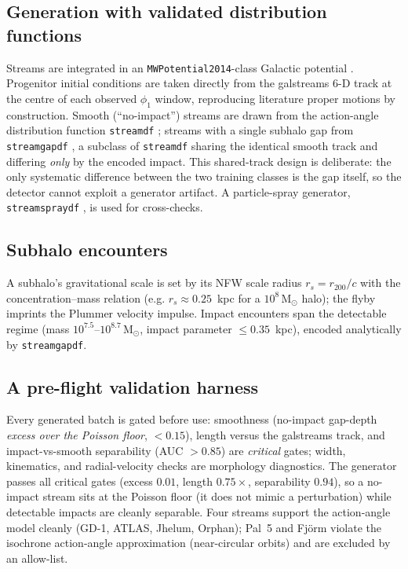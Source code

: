 \documentclass[fleqn,usenatbib]{mnras}
\newcommand{\msun}{\ensuremath{\mathrm{M}_\odot}}
\newcommand{\code}[1]{\texttt{#1}}
\begin{document}
\subsection{Generation with validated distribution functions}
Streams are integrated in an \code{MWPotential2014}-class Galactic potential
\citep[galpy, C \code{dop853} integrator;][]{Bovy2015galpy}. Progenitor initial
conditions are taken directly from the galstreams \citep{Mateu2023galstreams} 6-D
track at the centre of each observed $\phi_1$ window, reproducing literature proper
motions by construction. Smooth (``no-impact'') streams are drawn from the
action-angle distribution function \code{streamdf} \citep{Bovy2014streamdf}; streams
with a single subhalo gap from \code{streamgapdf} \citep{SandersBovyErkal2016}, a
subclass of \code{streamdf} sharing the identical smooth track and differing
\emph{only} by the encoded impact. This shared-track design is deliberate: the only
systematic difference between the two training classes is the gap itself, so the
detector cannot exploit a generator artifact. A particle-spray generator,
\code{streamspraydf} \citep{Fardal2015}, is used for cross-checks.

\subsection{Subhalo encounters}
A subhalo's gravitational scale is set by its NFW scale radius $r_s=r_{200}/c$ with the
\citet{Ludlow2016} concentration--mass relation (e.g. $r_s\approx0.25$~kpc for a
$10^8\,\msun$ halo); the flyby imprints the \citet{ErkalBelokurov2015} Plummer
velocity impulse. Impact encounters span the detectable regime (mass
$10^{7.5}$--$10^{8.7}\,\msun$, impact parameter $\le0.35$~kpc), encoded analytically by
\code{streamgapdf}.

\subsection{A pre-flight validation harness}
Every generated batch is gated before use: smoothness (no-impact gap-depth
\emph{excess over the Poisson floor}, $<0.15$), length versus the galstreams track,
and impact-vs-smooth separability (AUC $>0.85$) are \emph{critical} gates; width,
kinematics, and radial-velocity checks are morphology diagnostics. The generator
passes all critical gates (excess $0.01$, length $0.75\times$, separability $0.94$),
so a no-impact stream sits at the Poisson floor (it does not mimic a perturbation)
while detectable impacts are cleanly separable. Four streams support the action-angle
model cleanly (GD-1, ATLAS, Jhelum, Orphan); Pal~5 and Fj\"orm violate the isochrone
action-angle approximation (near-circular orbits) and are excluded by an allow-list.
\end{document}
